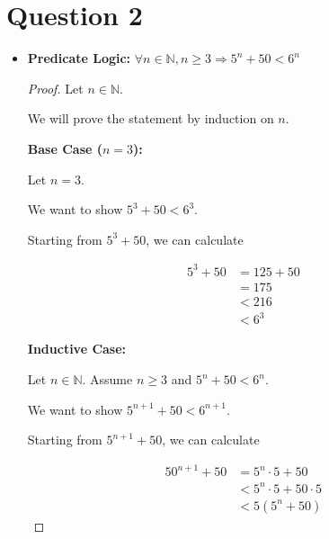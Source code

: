 \documentclass[12pt]{article}
\begin{document}
\section*{Question 2}
\begin{itemize}
    \item

    \textbf{Predicate Logic:} $\forall n \in \mathbb{N}, n \geq 3 \Rightarrow 5^n + 50 < 6^n$

    \bigskip

    \begin{proof}

    Let $n \in \mathbb{N}$.

    \bigskip

    We will prove the statement by induction on $n$.

    \bigskip

    \textbf{Base Case ($n = 3$):}

    \bigskip

    Let $n = 3$.

    \bigskip

    We want to show $5^3 + 50 < 6^3$.

    \bigskip

    Starting from $5^3 + 50$, we can calculate

    \setcounter{equation}{0}
    \begin{align}
        5^3 + 50 &= 125 + 50\\
        &= 175\\
        &< 216\\
        &< 6^3
    \end{align}

    \bigskip

    \textbf{Inductive Case:}

    \bigskip

    Let $n \in \mathbb{N}$. Assume $n \geq 3$ and $5^n + 50 < 6^n$.

    \bigskip

    We want to show $5^{n+1} + 50 < 6^{n+1}$.

    \bigskip

    Starting from $5^{n+1} + 50$, we can calculate

    \begin{align}
        50^{n+1} + 50 &= 5^n \cdot 5 + 50\\
        &< 5^n \cdot 5 + 50 \cdot 5\\
        &< 5(5^n + 50)
    \end{align}


\end{proof}
\end{itemize}
\end{document}
